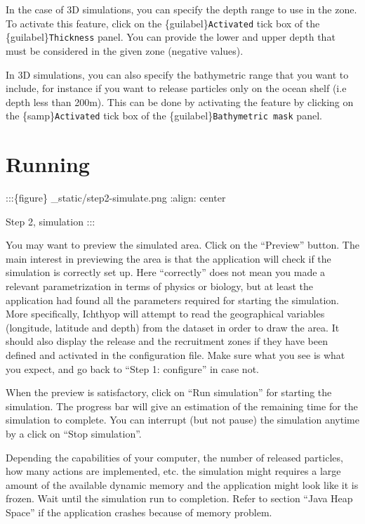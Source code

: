 \documentclass[
  letterpaper,
  DIV=11,
  numbers=noendperiod]{scrreprt}
\begin{document}
In the case of 3D simulations, you can specify the depth range to use in
the zone. To activate this feature, click on the
\{guilabel\}\texttt{Activated} tick box of the
\{guilabel\}\texttt{Thickness} panel. You can provide the lower and
upper depth that must be considered in the given zone (negative values).

In 3D simulations, you can also specify the bathymetric range that you
want to include, for instance if you want to release particles only on
the ocean shelf (i.e depth less than 200m). This can be done by
activating the feature by clicking on the \{samp\}\texttt{Activated}
tick box of the \{guilabel\}\texttt{Bathymetric\ mask} panel.

\section{Running}\label{running}

:::\{figure\} \_static/step2-simulate.png :align: center

Step 2, simulation :::

You may want to preview the simulated area. Click on the ``Preview''
button. The main interest in previewing the area is that the application
will check if the simulation is correctly set up. Here ``correctly''
does not mean you made a relevant parametrization in terms of physics or
biology, but at least the application had found all the parameters
required for starting the simulation. More specifically, Ichthyop will
attempt to read the geographical variables (longitude, latitude and
depth) from the dataset in order to draw the area. It should also
display the release and the recruitment zones if they have been defined
and activated in the configuration file. Make sure what you see is what
you expect, and go back to ``Step 1: configure'' in case not.

When the preview is satisfactory, click on ``Run simulation'' for
starting the simulation. The progress bar will give an estimation of the
remaining time for the simulation to complete. You can interrupt (but
not pause) the simulation anytime by a click on ``Stop simulation''.

Depending the capabilities of your computer, the number of released
particles, how many actions are implemented, etc. the simulation might
requires a large amount of the available dynamic memory and the
application might look like it is frozen. Wait until the simulation run
to completion. Refer to section ``Java Heap Space'' if the application
crashes because of memory problem.
\end{document}

